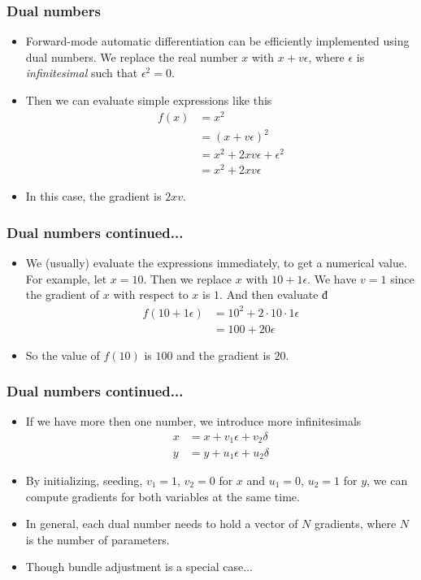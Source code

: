 \documentclass[serif,mathserif]{beamer}
\begin{document}
\begin{frame}
  \frametitle{Dual numbers}
  \begin{itemize} 
  \item Forward-mode automatic differentiation can be efficiently implemented using dual numbers.
  We replace the real number $x$ with $x + v \epsilon$, where $\epsilon$ is \emph{infinitesimal} such that $\epsilon^2=0$. \pause
  \item Then we can evaluate simple expressions like this
  \begin{align*}
  f(x) &= x^2 \\
  &= (x + v \epsilon)^2 \\
  &= x^2 + 2 x v \epsilon + \epsilon^2 \\
  &= x^2 + 2 x v \epsilon
  \end{align*} \pause
  \item In this case, the gradient is $2xv$.
  \end{itemize}
\end{frame}

\begin{frame}
  \frametitle{Dual numbers continued...}
  \begin{itemize} 
  \item We (usually) evaluate the expressions immediately, to get a numerical value.
  For example, let $x = 10$. Then we replace $x$ with $10 + 1\epsilon$. We have $v = 1$ since
  the gradient of $x$ with respect to $x$ is $1$. And then evaluate $đ$
  \begin{align*}
  f(10 + 1\epsilon) &= 10^2 + 2\cdot 10\cdot 1 \epsilon \\
  &= 100 + 20 \epsilon
  \end{align*} \pause
  \item So the value of $f(10)$ is $100$ and the gradient is $20$.
  \end{itemize}
\end{frame}

\begin{frame}
  \frametitle{Dual numbers continued...}
  \begin{itemize} 
  \item If we have more then one number, we introduce more infinitesimals
  \begin{align*}
  x &= x + v_1 \epsilon + v_2 \delta \\
  y &= y + u_1 \epsilon + u_2 \delta
  \end{align*} \pause
  \item By initializing, seeding, $v_1=1$, $v_2=0$ for $x$ and $u_1=0$, $u_2=1$ for $y$,
  we can compute gradients for both variables at the same time. \pause
  \item In general, each dual number needs to hold a vector of $N$ gradients, where $N$ is the number of parameters. \pause
  \item Though bundle adjustment is a special case...
  \end{itemize}
\end{frame}
\end{document}
